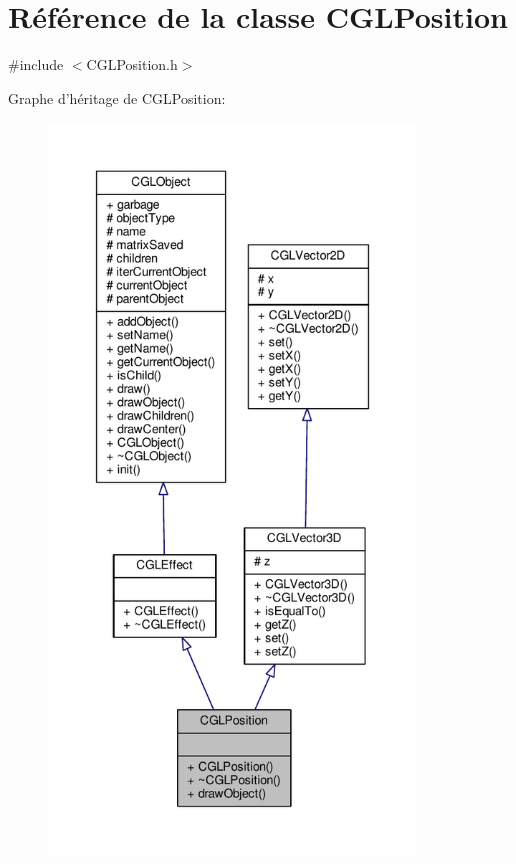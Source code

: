 \hypertarget{class_c_g_l_position}{\section{Référence de la classe C\-G\-L\-Position}
\label{class_c_g_l_position}
}


{\ttfamily \#include $<$C\-G\-L\-Position.\-h$>$}



Graphe d'héritage de C\-G\-L\-Position\-:
\nopagebreak
\begin{figure}[H]
\begin{center}
\leavevmode
\includegraphics[height=550pt]{d7/d46/class_c_g_l_position__inherit__graph}
\end{center}
\end{figure}



